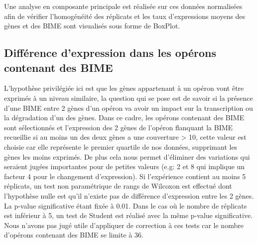 \documentclass[12pt,a4paper]{report}
\begin{document}
\begin{onehalfspace}
Une analyse en composante principale est réalisée sur ces données normalisées afin de vérifier l'homogénéité des réplicats et les taux d'expressions moyens des gènes et des BIME sont visualisés sous forme de BoxPlot.

\subsection*{Différence d'expression dans les opérons contenant des BIME}
\label{subsec:expression}
L'hypothèse privilégiée ici est que les gènes appartenant à un opéron vont être exprimés à un niveau similaire, la question qui se pose est de savoir si la présence d'une BIME entre 2 gènes d'un opéron va avoir un impact sur la transcription ou la dégradation d'un des gènes. Dans ce cadre, les opérons contenant des BIME sont sélectionnés et l'expression des 2 gènes de l'opéron flanquant la BIME recueillie si au moins un des deux gènes a une couverture > 10, cette valeur est choisie car elle représente le premier quartile de nos données, supprimant les gènes les moins exprimés. De plus cela nous permet d'éliminer des variations qui seraient jugées importantes pour de petites valeurs (e.g: 2 et 8 qui implique un facteur 4 pour le changement d'expression). Si l'expérience contient au moins 5 réplicats, un test non paramétrique de rangs de Wilcoxon est effectué dont l'hypothèse nulle est qu'il n'existe pas de différence d'expression entre les 2 gènes. La p-value significative étant fixée à 0.01. Dans le cas où le nombre de réplicats est inférieur à 5, un test de Student est réalisé avec la même p-value significative. Nous n'avons pas jugé utile d'appliquer de correction à ces tests car le nombre d'opérons contenant des BIME se limite à 36.


\end{onehalfspace}
\end{document}
